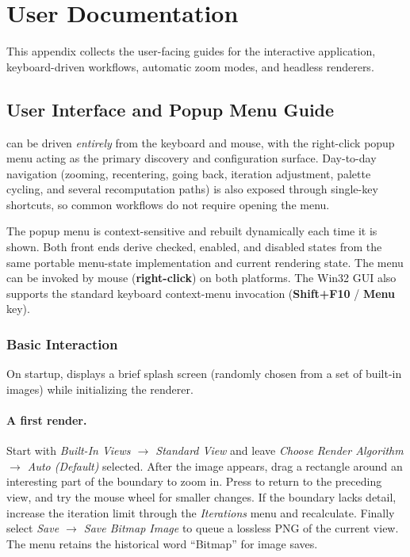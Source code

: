 \section{User Documentation}
\label{sec:user-documentation}

This appendix collects the user-facing guides for the interactive application,
keyboard-driven workflows, automatic zoom modes, and headless renderers.

\subsection{User Interface and Popup Menu Guide}
\label{sec:ui-popup-menu}

\FractalShark{} can be driven \emph{entirely} from the keyboard and mouse, with the
right-click popup menu acting as the primary discovery and configuration
surface.  Day-to-day navigation (zooming, recentering, going back, iteration
adjustment, palette cycling, and several recomputation paths) is also exposed
through single-key shortcuts, so common workflows do not require opening the
menu.

The popup menu is context-sensitive and rebuilt dynamically each time it is
shown. Both front ends derive checked, enabled, and disabled states from the
same portable menu-state implementation and current rendering state. The menu
can be invoked by mouse (\textbf{right-click}) on both
platforms. The Win32 GUI also supports the standard keyboard context-menu
invocation (\textbf{Shift+F10} / \textbf{Menu} key).

\subsubsection{Basic Interaction}

On startup, \FractalShark{} displays a brief splash screen (randomly chosen
from a set of built-in images) while initializing the renderer.

\paragraph{A first render.}
Start with \emph{Built-In Views $\to$ Standard View} and leave
\emph{Choose Render Algorithm $\to$ Auto (Default)} selected. After the image
appears, drag a rectangle around an interesting part of the boundary to zoom
in. Press  to return to the preceding view, and try the mouse wheel
for smaller changes. If the boundary lacks detail, increase the iteration
limit through the \emph{Iterations} menu and recalculate. Finally select
\emph{Save $\to$ Save Bitmap Image} to queue a lossless PNG of the current
view. The menu retains the historical word ``Bitmap'' for image saves.

